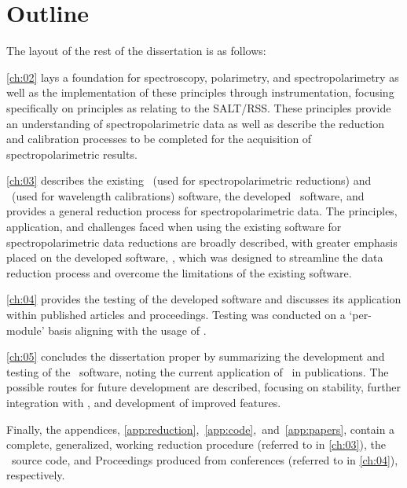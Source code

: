 \section{Outline}

\noindent The layout of the rest of the dissertation is as follows:

\autoref{ch:02} lays a foundation for spectroscopy, polarimetry, and spectropolarimetry as well as the implementation of these principles through instrumentation, focusing specifically on principles as relating to the \gls{SALT}/\gls{RSS}.
These principles provide an understanding of spectropolarimetric data as well as describe the reduction and calibration processes to be completed for the acquisition of spectropolarimetric results.

\autoref{ch:03} describes the existing \polsalt\ (used for spectropolarimetric reductions) and \iraf\ (used for wavelength calibrations) software, the developed \stops\ software, and provides a general reduction process for spectropolarimetric data.
The principles, application, and challenges faced when using the existing software for spectropolarimetric data reductions are broadly described, with greater emphasis placed on the developed software, \stops, which was designed to streamline the data reduction process and overcome the limitations of the existing software.

\autoref{ch:04} provides the testing of the developed software and discusses its application within published articles and proceedings.
Testing was conducted on a `per-module' basis aligning with the usage of \stops.

\autoref{ch:05} concludes the dissertation proper by summarizing the development and testing of the \stops\ software, noting the current application of \stops\ in publications.
The possible routes for future development are described, focusing on stability, further integration with \polsalt, and development of improved features.

Finally, the appendices, \autoref{app:reduction},~\ref{app:code},~and~\ref{app:papers}, contain a complete, generalized, working reduction procedure (referred to in \autoref{ch:03}), the \stops\ source code, and Proceedings produced from conferences (referred to in \autoref{ch:04}), respectively.
